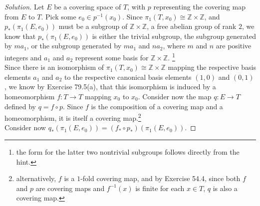 \documentclass[11pt]{article}
\newcommand{\Z}{\mathbb{Z}}
\newenvironment{solution}
  {\renewcommand\qedsymbol{$\blacksquare$}\begin{proof}[Solution]}
  {\end{proof}}
\begin{document}
\begin{solution}

Let $E$ be a covering space of $T$, with $p$ representing the covering map from $E$ to $T$. Pick some $e_0 \in p^{-1}(x_0)$. 
Since $\pi_1(T, x_0) \cong \Z \times \Z$, and $p_{\ast} (\pi_1(E, e_0))$ must be a subgroup of $\Z \times \Z$, a free abelian group of rank $2$, we know that $p_{\ast} (\pi_1(E, e_0))$ is either the trivial subgroup,
the subgroup generated by $ma_1$, or the subgroup generated by $ma_1$ and $na_2$, where $m$ and $n$ are positive integers and $a_1$ and $a_2$ represent some basis for $\Z \times \Z$.
\footnote{the form for the latter two nontrivial subgroups follows directly from the hint.} \\

Since there is an isomorphism of $\pi_1(T, x_0) \cong \Z \times \Z$ mapping the respective basis elements $a_1$ and $a_2$ to the respective canonical basis elements $(1, 0)$ and $(0, 1)$, we know by Exercise 79.5(a),
that this isomorphism is induced by a homeomorphism $f \colon T \rightarrow T$ mapping $x_0$ to $x_0$. Consider now the map $q \colon E \rightarrow T$ defined by $q = f \circ p$. Since $f$ is the composition of a covering map and 
a homeomorphism, it is itself a covering map.\footnote{alternatively, $f$ is a $1$-fold covering map, and by Exercise 54.4, since both $f$ and $p$ are covering maps and $f^{-1}(x)$ is finite for each $x \in T$, $q$ is also a covering map.} \\

Consider now $q_{\ast}(\pi_1(E, e_0)) = (f_{\ast} \circ p_{\ast}) (\pi_1(E, e_0))$. 

\end{solution}

\end{document}

